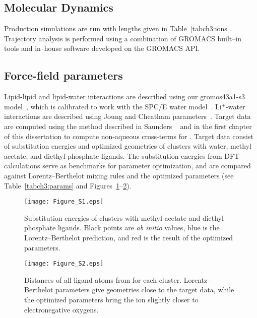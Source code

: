 \subsection{Molecular Dynamics}

Production simulations are run with lengths given in Table~\ref{tabch3:ions}.
Trajectory analysis is performed using a combination of GROMACS built--in
tools and in--house software developed on the GROMACS API.


\subsection{Force-field parameters}

Lipid-lipid and lipid-water interactions are described using our 
gromos43a1-s3 model~\cite{chiu:2009}, 
which is calibrated to work with the SPC/E water model~\cite{spce}. 
Li$^+$-water interactions 
are described using Joung and Cheatham parameters~\cite{joung:2008}. 
Target data are computed using the method described in Saunders \etal~\cite{saunders:2022} and in the first chapter of this dissertation
to compute non-aqueous cross-terms for \li{}. Target data consist of substitution
energies and optimized geometries of \li{} clusters with water, methyl acetate,
and diethyl phosphate ligands. The substitution energies from DFT calculations
serve as benchmarks for parameter optimization, and are compared against
Lorentz–Berthelot mixing rules and the optimized parameters
(see Table~\ref{tabch3:params} and Figures~\ref{figch3:energies}--\ref{figch3:distances}).

\begin{figure}
    \caption[Substitution energies of \li{} from solvent to ligands]{Substitution energies of \li{} clusters with methyl acetate and diethyl phosphate ligands.
    Black points are \emph{ab initio} values, blue is the Lorentz--Berthelot prediction, and red is the result of the optimized parameters.}
    \label{figch3:energies}
    \texttt{[image: Figure\_S1.eps]}
\end{figure}

\begin{figure}
    \caption[Geometries of \li{} clusters with ligands]{Distances of all ligand atoms from \li{} for each cluster. 
    Lorentz--Berthelot parameters give geometries close to the target data, while the optimized parameters
    bring the ion slightly closer to electronegative oxygens.}
    \label{figch3:distances}
    \texttt{[image: Figure\_S2.eps]}
\end{figure}

